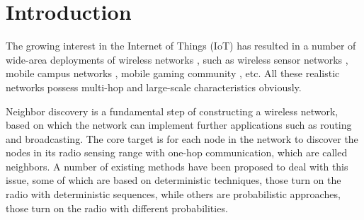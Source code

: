 \section{Introduction}






The growing interest in the Internet of Things (IoT) has resulted 
in a number of wide-area deployments of wireless networks \cite{qin2014software},
such as wireless sensor networks \cite{yick2008wireless}, mobile campus networks 
\cite{hernandez2005comparative}, mobile gaming community \cite{cunningham2002optimizing}, etc.
All these realistic networks possess multi-hop and large-scale characteristics obviously.

Neighbor discovery is a fundamental step of constructing a wireless network, based on 
which the network can implement further applications such as routing and broadcasting.
The core target is for each node in the network to discover the nodes in its radio sensing range 
with one-hop communication, which are called neighbors. 
A number of existing methods \cite{dutta2008practical, kandhalu2010u,
bakht2012searchlight, sun2014hello, chen2015heterogeneous,
wang2015blinddate, qiu2016talk, mcglynn2001birthday,
vasudevan2009neighbor, you2011aloha, song2014probabilistic} have been proposed 
to deal with this issue, some of which are based on deterministic techniques, 
those turn on the radio with deterministic sequences,
while others are probabilistic approaches, those turn on the radio with different probabilities.


